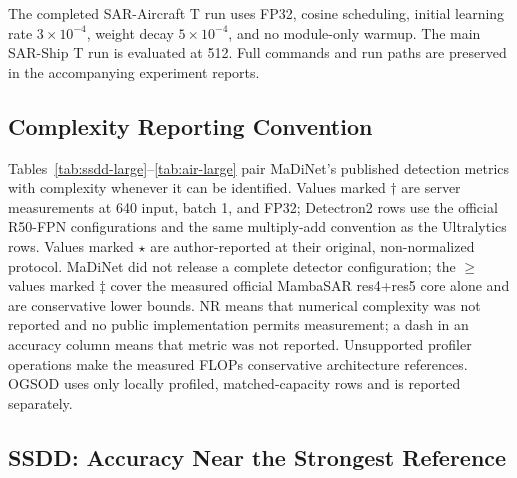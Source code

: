 \documentclass[letterpaper]{article}
\begin{document}
The completed SAR-Aircraft T run uses FP32, cosine scheduling, initial learning rate $3\times10^{-4}$, weight decay $5\times10^{-4}$, and no module-only warmup. The main SAR-Ship T run is evaluated at 512. Full commands and run paths are preserved in the accompanying experiment reports.

\subsection{Complexity Reporting Convention}

Tables~\ref{tab:ssdd-large}--\ref{tab:air-large} pair MaDiNet's published detection metrics with complexity whenever it can be identified. Values marked $\dagger$ are server measurements at 640 input, batch 1, and FP32; Detectron2 rows use the official R50-FPN configurations and the same multiply-add convention as the Ultralytics rows. Values marked $\star$ are author-reported at their original, non-normalized protocol. MaDiNet did not release a complete detector configuration; the $\geq$ values marked $\ddagger$ cover the measured official MambaSAR res4+res5 core alone and are conservative lower bounds. NR means that numerical complexity was not reported and no public implementation permits measurement; a dash in an accuracy column means that metric was not reported. Unsupported profiler operations make the measured FLOPs conservative architecture references. OGSOD uses only locally profiled, matched-capacity rows and is reported separately.

\subsection{SSDD: Accuracy Near the Strongest Reference}
\end{document}
